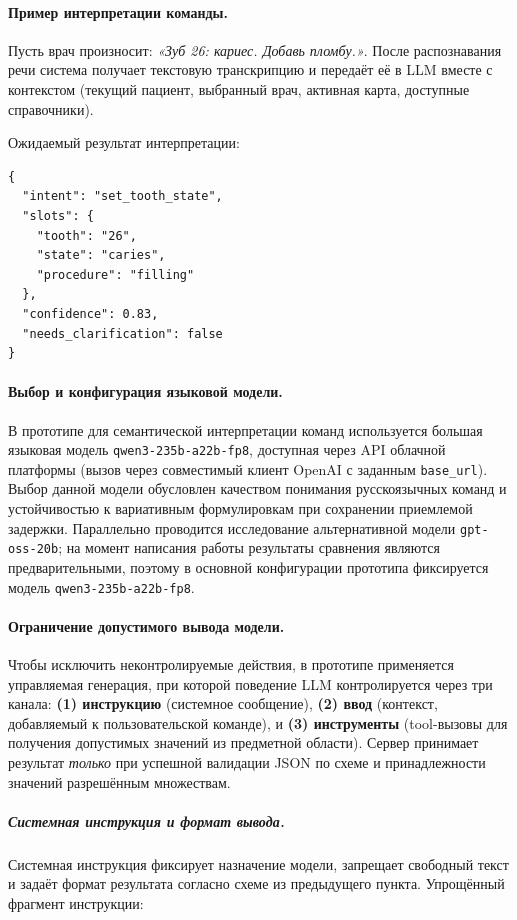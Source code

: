 \paragraph{Пример интерпретации команды.}
Пусть врач произносит: \textit{«Зуб 26: кариес. Добавь пломбу.»}.
После распознавания речи система получает текстовую транскрипцию и передаёт её в LLM вместе с контекстом
(текущий пациент, выбранный врач, активная карта, доступные справочники).

Ожидаемый результат интерпретации:
\begin{verbatim}
{
  "intent": "set_tooth_state",
  "slots": {
    "tooth": "26",
    "state": "caries",
    "procedure": "filling"
  },
  "confidence": 0.83,
  "needs_clarification": false
}
\end{verbatim}


\paragraph{Выбор и конфигурация языковой модели.}
В прототипе для семантической интерпретации команд используется большая языковая модель \texttt{qwen3-235b-a22b-fp8}, доступная через API облачной платформы (вызов через совместимый клиент OpenAI с заданным \texttt{base\_url}).
Выбор данной модели обусловлен качеством понимания русскоязычных команд и устойчивостью к вариативным формулировкам при сохранении приемлемой задержки.
Параллельно проводится исследование альтернативной модели \texttt{gpt-oss-20b}; на момент написания работы результаты сравнения являются предварительными, поэтому в основной конфигурации прототипа фиксируется модель \texttt{qwen3-235b-a22b-fp8}.

\paragraph{Ограничение допустимого вывода модели.}
Чтобы исключить неконтролируемые действия, в прототипе применяется управляемая генерация, при которой поведение LLM контролируется через три канала:
\textbf{(1) инструкцию} (системное сообщение), \textbf{(2) ввод} (контекст, добавляемый к пользовательской команде), и \textbf{(3) инструменты} (tool-вызовы для получения допустимых значений из предметной области).
Сервер принимает результат \emph{только} при успешной валидации JSON по схеме и принадлежности значений разрешённым множествам.

\subparagraph{Системная инструкция и формат вывода.}
Системная инструкция фиксирует назначение модели, запрещает свободный текст и задаёт формат результата согласно схеме из предыдущего пункта.
Упрощённый фрагмент инструкции:

